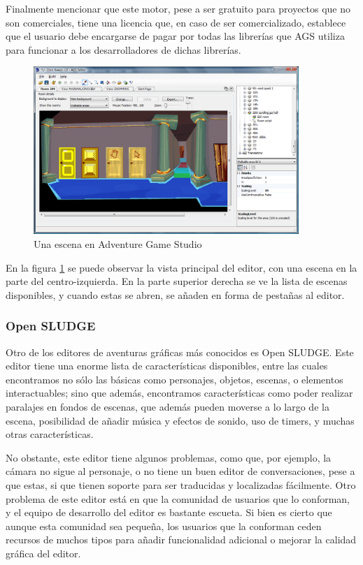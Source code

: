 Finalmente mencionar que este motor, pese a ser gratuito para proyectos que no son comerciales, tiene una licencia que, en caso de ser comercializado, establece que el usuario debe encargarse de pagar por todas las librerías que AGS utiliza para funcionar a los desarrolladores de dichas librerías.

\begin{figure}[htb]
	\centerline{\includegraphics[height=2.5in]{figures/ags.png}}
	\caption[Adventure Game Studio]{Una escena en Adventure Game Studio}
	\label{agsfigure}
\end{figure}

En la figura \ref{agsfigure} se puede observar la vista principal del editor, con una escena en la parte del centro-izquierda. En la parte superior derecha se ve la lista de escenas disponibles, y cuando estas se abren, se añaden en forma de pestañas al editor.

\subsubsection{Open SLUDGE}
\label{opensludge}

Otro de los editores de aventuras gráficas más conocidos es Open SLUDGE. Este editor tiene una enorme lista de características disponibles, entre las cuales encontramos no sólo las básicas como personajes, objetos, escenas, o elementos interactuables; sino que además, encontramos características como poder realizar paralajes en fondos de escenas, que además pueden moverse a lo largo de la escena, posibilidad de añadir música y efectos de sonido, uso de timers, y muchas otras características.

No obstante, este editor tiene algunos problemas, como que, por ejemplo, la cámara no sigue al personaje, o no tiene un buen editor de conversaciones, pese a que estas, si que tienen soporte para ser traducidas y localizadas fácilmente. Otro problema de este editor está en que la comunidad de usuarios que lo conforman, y el equipo de desarrollo del editor es bastante escueta. Si bien es cierto que aunque esta comunidad sea pequeña, los usuarios que la conforman ceden recursos de muchos tipos para añadir funcionalidad adicional o mejorar la calidad gráfica del editor.

